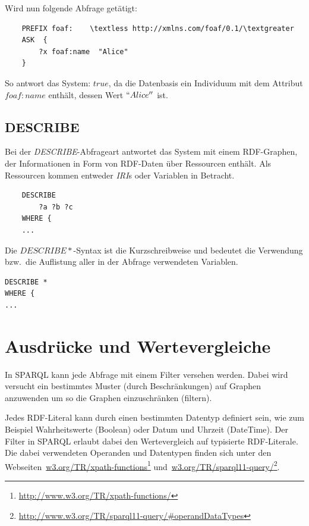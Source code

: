 Wird nun folgende Abfrage getätigt:
\lstset{language=XML}
\begin{lstlisting}
    PREFIX foaf:    \textless http://xmlns.com/foaf/0.1/\textgreater 
    ASK  { 
        ?x foaf:name  "Alice"
    }
\end{lstlisting}
So antwort das System: $true$, da die Datenbasis ein Individuum mit dem Attribut $foaf:name$ enthält, dessen Wert $``Alice''$ ist.

\subsection{DESCRIBE}
\label{subsec:sparql_abfragearten_describe}
Bei der \textit{DESCRIBE}-Abfrageart antwortet das System mit einem RDF-Graphen, der Informationen in Form von RDF-Daten über Ressourcen enthält. Als Ressourcen kommen entweder \textit{IRI}s oder Variablen in Betracht.

\begin{lstlisting}
    DESCRIBE
        ?a ?b ?c
    WHERE {
    ...
\end{lstlisting}

Die $ DESCRIBE * $-Syntax ist die Kurzschreibweise und bedeutet die Verwendung bzw.\ die Auflistung aller in der Abfrage verwendeten Variablen.
\begin{lstlisting}
DESCRIBE *
WHERE {
...
\end{lstlisting}

\section{Ausdrücke und Wertevergleiche}
\label{sec:sparql_ausdruecke}
In SPARQL kann jede Abfrage mit einem Filter versehen werden. Dabei wird versucht ein bestimmtes Muster (durch Beschränkungen) auf Graphen anzuwenden um so die Graphen einzuschränken (filtern).

Jedes RDF-Literal kann durch einen bestimmten Datentyp definiert sein, wie zum Beispiel Wahrheitswerte (Boolean) oder Datum und Uhrzeit (DateTime). Der Filter in SPARQL erlaubt dabei den Wertevergleich auf typisierte RDF-Literale. Die dabei verwendeten Operanden und Datentypen finden sich unter den Webseiten~\href{http://www.w3.org/TR/xpath-functions/}{w3.org/TR/xpath-functions}\footnote{\url{http://www.w3.org/TR/xpath-functions/}} und~\href{http://www.w3.org/TR/sparql11-query/\#operandDataTypes}{w3.org/TR/sparql11-query/}\footnote{\url{http://www.w3.org/TR/sparql11-query/\#operandDataTypes}}.

